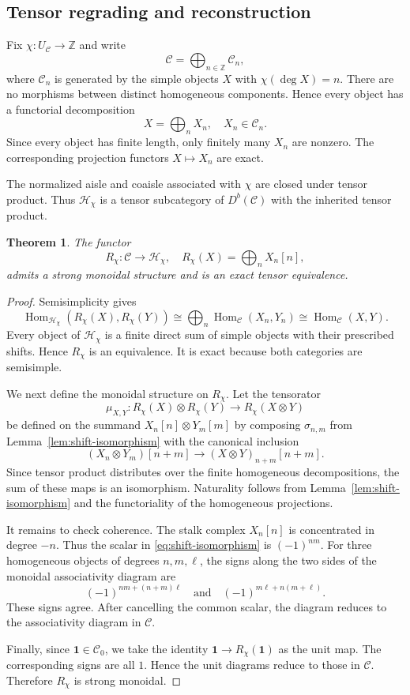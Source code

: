 \documentclass[11pt]{amsart}
\newcommand{\C}{\mathcal C}
\newcommand{\Hh}{\mathcal H}
\newcommand{\one}{\mathbf 1}
\DeclareMathOperator{\Hom}{Hom}
\newtheorem{theorem}{Theorem}[section]
\theoremstyle{definition}
\theoremstyle{remark}
\theoremstyle{plain}
\begin{document}
\subsection{Tensor regrading and reconstruction}\label{subsec:tensor-reconstruction}

Fix $\chi: U_{\C}\to\mathbb Z$ and write
\[
\C=\bigoplus_{n\in\mathbb Z}\C_n,
\]
where $\C_n$ is generated by the simple objects $X$ with $\chi(\deg X)=n$. There are no morphisms between distinct homogeneous components. Hence every object has a functorial decomposition
\[
X=\bigoplus_n X_n,\quad X_n\in\C_n.
\]
Since every object has finite length, only finitely many $X_n$ are nonzero. The corresponding projection functors $X\mapsto X_n$ are exact.


The normalized aisle and coaisle associated with $\chi$ are closed under tensor product. Thus $\Hh_\chi$ is a tensor subcategory of $D^b(\C)$ with the inherited tensor product.

\begin{theorem}\label{thm:tensor-regrading}
The functor
\[
R_\chi:\C\rightarrow\Hh_\chi,\quad R_\chi(X)=\bigoplus_n X_n[n],
\]
admits a strong monoidal structure and is an exact tensor equivalence.
\end{theorem}

\begin{proof}
Semisimplicity gives
\[
\Hom_{\Hh_\chi}(R_\chi(X),R_\chi(Y))\cong\bigoplus_n\Hom_{\C}(X_n,Y_n)\cong\Hom_{\C}(X,Y).
\]
Every object of $\Hh_\chi$ is a finite direct sum of simple objects with their prescribed shifts. Hence $R_\chi$ is an equivalence. It is exact because both categories are semisimple.

We next define the monoidal structure on $R_\chi$. Let the tensorator
\[
\mu_{X,Y}: R_\chi(X)\otimes R_\chi(Y)\rightarrow R_\chi(X\otimes Y)
\]
be defined on the summand $X_n[n]\otimes Y_m[m]$ by composing $\sigma_{n,m}$ from Lemma~\ref{lem:shift-isomorphism} with the canonical inclusion
\[
(X_n\otimes Y_m)[n+m]\rightarrow(X\otimes Y)_{n+m}[n+m].
\]
Since tensor product distributes over the finite homogeneous decompositions, the sum of these maps is an isomorphism. Naturality follows from Lemma~\ref{lem:shift-isomorphism} and the functoriality of the homogeneous projections.

It remains to check coherence. The stalk complex $X_n[n]$ is concentrated in degree $-n$. Thus the scalar in \eqref{eq:shift-isomorphism} is $(-1)^{nm}$. For three homogeneous objects of degrees $n,m,\ell$, the signs along the two sides of the monoidal associativity diagram are
\[
(-1)^{nm+(n+m)\ell} \quad\text{and}\quad (-1)^{m\ell+n(m+\ell)}.
\]
These signs agree. After cancelling the common scalar, the diagram reduces to the associativity diagram in $\C$.

Finally, since $\one\in\C_0$, we take the identity $\one\to R_\chi(\one)$ as the unit map. The corresponding signs are all $1$. Hence the unit diagrams reduce to those in $\C$. Therefore $R_\chi$ is strong monoidal.
\end{proof}
\end{document}
